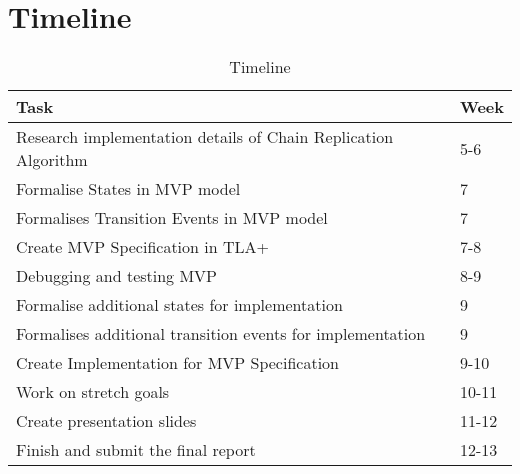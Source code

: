 \section{Timeline}
\setcounter{subsection}{0}
\renewcommand*{\thesubsection}{\Alph{subsection}.}

\renewcommand{\arraystretch}{1.2}
\begin{table}[h]
    \centering
    \caption{Timeline}
    \label{table:timeline}
    \begin{tabular}{l l}
        \toprule
        \textbf{Task} & \textbf{Week}\\
        \midrule
        Research implementation details of Chain Replication Algorithm & 5-6\\
        Formalise States in MVP model & 7\\
        Formalises Transition Events in MVP model & 7\\
        Create MVP Specification in TLA+ & 7-8\\
        Debugging and testing MVP & 8-9\\
        Formalise additional states for implementation & 9\\
        Formalises additional transition events for implementation & 9\\
        Create Implementation for MVP Specification & 9-10\\
        Work on stretch goals & 10-11\\
        Create presentation slides & 11-12\\
        Finish and submit the final report & 12-13\\
        \bottomrule
    \end{tabular} \\
\end{table}
